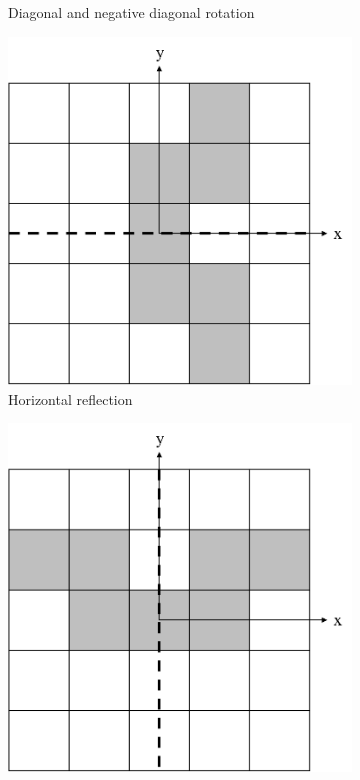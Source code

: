 \begin{figure}[H]
\begin{subfigure}[t]{0.3\textwidth}
		\caption{Diagonal and negative diagonal rotation}
	\end{subfigure}
	\hfill
	\begin{subfigure}[t]{0.3\textwidth}
		\centering
		\includegraphics[width=\textwidth]{LSSymRefH.png}
		\caption{Horizontal reflection}
	\end{subfigure}
	\hfill
	\begin{subfigure}[t]{0.3\textwidth}
		\centering
		\includegraphics[width=\textwidth]{LSSymRefV.png}

\end{subfigure}
\end{figure}
